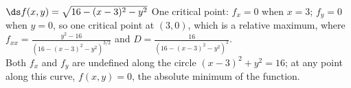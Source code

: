 {$\ds f(x,y) = \sqrt{16-(x-3)^2-y^2}$
}
{
One critical point: $f_x = 0$ when $x=3$; $f_y = 0$ when $y = 0$, so one critical point at $(3,0)$, which is a relative maximum, where 
$f_{xx} = \frac{y^2-16}{(16-(x-3)^2-y^2)^{3/2}}$ and $D = \frac{16}{(16-(x-3)^2-y^2)^{2}}$.\\
Both $f_x$ and $f_y$ are undefined along the circle $(x-3)^2+y^2=16$; at any point along this curve, $f(x,y)=0$, the absolute minimum of the function.
}